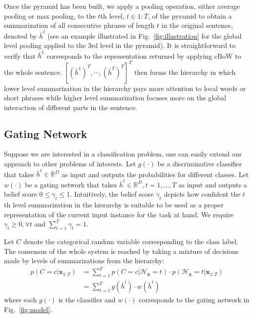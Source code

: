 \documentclass{article}
\newcommand{\RR}{\mathbb{R}}
\theoremstyle{definition}
\begin{document}
Once the pyramid has been built, we apply a pooling operation, either average pooling or max pooling, to the $t$th level, $t\in 1:T$, of the pyramid to obtain a summarization of all consecutive phrases of length $t$ in the original sentence, denoted by $\bar{h}^t$ (see an example illustrated in Fig.~\ref{fig:illustration} for the global level pooling applied to the 3rd level in the pyramid).
It is straightforward to verify that $\bar{h}^1$ corresponds to the representation returned by applying cBoW to the whole sentence. $[(\bar{h}^1)^T, \cdots, (\bar{h}^T)^T]^T$ then forms the hierarchy in which lower level summarization in the hierarchy pays more attention to local words or short phrases while higher level summarization focuses more on the global interaction of different parts in the sentence.

\subsection{Gating Network}
Suppose we are interested in a classification problem, one can easily extend our approach to other problems of interests. Let $g(\cdot)$ be a discriminative classifier that takes $\bar{h}^t\in\RR^D$ as input and outputs the probabilities for different classes. Let $w(\cdot)$ be a gating network that takes $\bar{h}^t\in\RR^D, t=1, \ldots, T$ as input and outputs a belief score $0\leq\gamma_t\leq 1$. Intuitively, the belief score $\gamma_t$ depicts how confident the $t$th level summarization in the hierarchy is suitable to be used as a proper representation of the current input instance for the task at hand. We require $\gamma_t\geq 0, \forall t$ and $\sum_{t=1}^{T}\gamma_t = 1$.

Let $C$ denote the categorical random variable corresponding to the class label. The consensus of the whole system is reached by taking a mixture of decisions made by levels of summarizations from the hierarchy:
\begin{align}
p(C = c | \mathbf{x}_{1:T}) & = \sum_{t = 1}^{T}p(C = c | \mathcal{H}_{\mathbf{x}} = t)\cdot p(\mathcal{H}_{\mathbf{x}} = t | \mathbf{x}_{1:T}) \nonumber\\
&= \sum_{t=1}^Tg(\bar{h}^t)\cdot w(\bar{h}^t)
\end{align}
where each $g(\cdot)$ is the classifier and $w(\cdot)$ corresponds to the gating network in Fig.~\ref{fig:model}.
\end{document}
